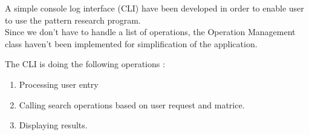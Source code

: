 A simple console log interface (CLI) have been developed in order to enable user to use the pattern research program.\\
Since we don't have to handle a list of operations, the Operation Management class haven't been implemented for simplification of the application.

The CLI is doing the following operations :
\begin{enumerate}
    \item Processing user entry
    \item Calling search operations based on user request and matrice.
    \item Displaying results.
\end{enumerate}
